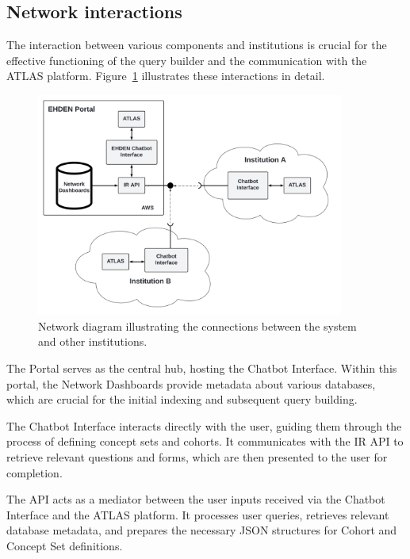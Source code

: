 \subsection{Network interactions}

The interaction between various components and institutions is crucial for the effective functioning of the query builder and the communication with the ATLAS platform. Figure~\ref{fig_network} illustrates these interactions in detail.

\begin{figure}[H]
  \includegraphics[width=0.9\textwidth]{figs/chapter4/network_diagram.png}
  \centering
  \caption[Network diagram between components]{Network diagram illustrating the connections between the system and other institutions.}
  \label{fig_network}
\end{figure}

The {\ehden} Portal serves as the central hub, hosting the {\ehden} Chatbot Interface. Within this portal, the Network Dashboards provide metadata about various databases, which are crucial for the initial indexing and subsequent query building.

The {\ehden} Chatbot Interface interacts directly with the user, guiding them through the process of defining concept sets and cohorts. It communicates with the IR API to retrieve relevant questions and forms, which are then presented to the user for completion.

The {\ir} API acts as a mediator between the user inputs received via the Chatbot Interface and the ATLAS platform. It processes user queries, retrieves relevant database metadata, and prepares the necessary JSON structures for Cohort and Concept Set definitions.

